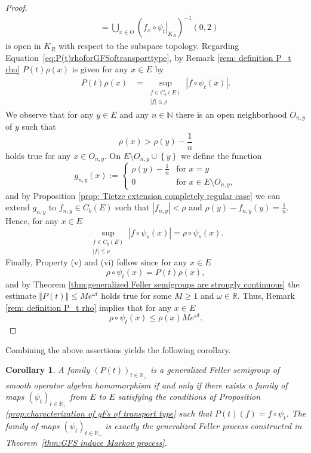 \documentclass[a4paper,12pt]{article}
\newtheorem{corollary}[theorem]{Corollary}
\theoremstyle{definition}
\theoremstyle{remark}
\numberwithin{equation}{section}
\numberwithin{theorem}{section}
\begin{document}
\begin{proof}
\begin{align*}
 & =\underset{x\in O}{\bigcup}\left(\left.f_{x}\circ\psi_{t}\right|_{K_{R}}\right)^{-1}\left(0,2\right)
\end{align*}
is open in $K_{R}$ with respect to the subspace topology. 
Regarding Equation~\eqref{eq:P(t)rhoforGFSoftransporttype}, by Remark
\ref{rem: definition P_t rho} $P(t)\rho(x)$
is given for any $x\in E$ by 
\begin{align*}
P(t)\rho(x) & =\underset{\begin{array}{c}
f\in C_{b}(E)\\
\left|f\right|\leq\rho
\end{array}}{\sup}\left|f\circ\psi_{t}(x)\right|.
\end{align*}
We observe that for any $y\in E$ and any $n\in\mathbb{N}$ there
is an open neighborhood $O_{n,y}$ of $y$ such that
\[
\rho(x)>\rho(y)-\frac{1}{n}
\]
holds true for any $x\in O_{n,y}$. On $E\setminus O_{n,y}\cup\left\{ y\right\} $
we define the function
\[
g_{n,y}(x):=\begin{cases}
\rho(y)-\frac{1}{n} & \text{for }x=y\\
0 & \text{for }x\in E\setminus O_{n,y},
\end{cases}
\]
and by Proposition \ref{prop: Tietze extension completely regular case}
we can extend $g_{n,y}$ to $f_{n,y}\in C_{b}(E)$ such that $\left|f_{n,y}\right|<\rho$
and $\rho(y)-f_{n,y}(y)=\frac{1}{n}$. Hence, for any $x\in E$
\[
\underset{\begin{array}{c}
f\in C_{b}(E)\\
\left|f\right|\leq\rho
\end{array}}{\sup}\left|f\circ\psi_{s}(x)\right|=\rho\circ\psi_{s}(x).
\]
Finally, Property (v) and (vi) follow since for any $x\in E$
\[
\rho\circ\psi_{t}(x)=P(t)\rho(x),
\]
and by Theorem \ref{thm:generalized Feller semigroups are strongly continuous} the estimate $
\left\Vert P(t)\right\Vert \leq Me^{\omega t}
$
holds true for some $M\geq1$ and $\omega\in\mathbb{R}$. Thus, Remark
\ref{rem: definition P_t rho} implies
that for any $x\in E$
\[
\rho\circ\psi_{t}(x)\leq\rho(x)Me^{\omega t}.
\]
\end{proof}

Combining the above assertions yields the following corollary.

\begin{corollary}
A family $(P(t))_{t  \in \mathbb{R}_+}$  is a generalized Feller semigroup of smooth operator algebra homomorphism if and only if there exists a family of maps $\left(\psi_{t}\right)_{t\in\mathbb{R}_{+}}$
from $E$ to $E$ satisfying the conditions of Proposition \ref{prop:characterization of gFs of transport type}
such that
$
P(t)(f)=f\circ\psi_{t}$.
The family of  maps $(\psi_{t})_{t\in\mathbb{R}_{+}}$ is exactly the generalized Feller process constructed in Theorem~\ref{thm:GFS induce Markov process}.
\end{corollary}
\end{document}
